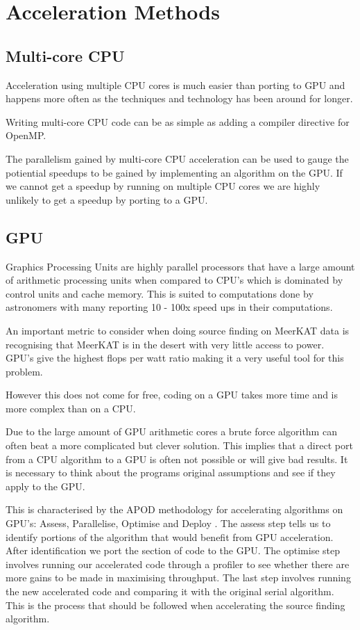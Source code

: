 \documentclass[prodmode,acmtecs]{acmsmall} \usepackage[ruled]{algorithm2e}
\begin{document}
\section{Acceleration Methods}
    \subsection{Multi-core CPU}
    Acceleration using multiple CPU cores is much easier than porting to GPU and happens more often as the techniques
    and technology has been around for longer. {\cite{fluke2011astrophysical}
    Writing multi-core CPU code can be as simple as adding a compiler directive for OpenMP\cite{cavuoti2014astrophysical}.

    The parallelism gained by multi-core CPU acceleration can be used to gauge the potiential speedups
    to be gained by implementing an algorithm on the GPU. If we cannot get a speedup by running
    on multiple CPU cores we are highly unlikely to get a speedup by porting to a GPU. 
    
        \cite{westerlund2014framework}
        \cite{scott}

    \subsection{GPU}
Graphics Processing Units are highly parallel processors that have a large amount of
arithmetic processing units when compared to CPU's which is dominated by control units
and cache memory. This is suited to computations done by astronomers with many reporting 
10 - 100x speed ups in their computations. \cite{hassan2011unleashing} 

An important metric to consider when doing source finding on MeerKAT data is recognising that
MeerKAT is in the desert with very little access to power. GPU's give the highest flops per watt
ratio making it a very useful tool for this problem.

However this does not come for free, coding on a GPU takes more time and is more complex than on a CPU. 

Due to the large amount of GPU arithmetic cores a brute force algorithm can often beat
a more complicated but clever solution.  \cite{fluke2011astrophysical} This implies that a direct port from
a CPU algorithm to a GPU is often not possible or will give bad results. It is necessary to think about the programs original
assumptions and see if they apply to the GPU. 

This is characterised by the APOD methodology for accelerating algorithms on GPU's: Assess, Parallelise, 
Optimise and Deploy \cite{cavuoti2014astrophysical}. The assess step tells us to identify portions of the
algorithm that would benefit from GPU acceleration. After identification we port the section of code
to the GPU. The optimise step involves running our accelerated code through a profiler to see whether 
there are more gains to be made in maximising throughput. The last step involves running the new
accelerated code and comparing it with the original serial algorithm. This is the process
that should be followed when accelerating the source finding algorithm. 

}
\end{document}
